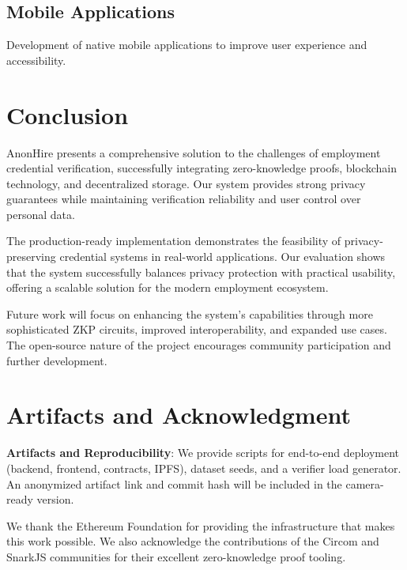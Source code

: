\documentclass[conference]{IEEEtran}
\begin{document}
\subsection{Mobile Applications}

Development of native mobile applications to improve user experience and accessibility.

\section{Conclusion}

AnonHire presents a comprehensive solution to the challenges of employment credential verification, successfully integrating zero-knowledge proofs, blockchain technology, and decentralized storage. Our system provides strong privacy guarantees while maintaining verification reliability and user control over personal data.

The production-ready implementation demonstrates the feasibility of privacy-preserving credential systems in real-world applications. Our evaluation shows that the system successfully balances privacy protection with practical usability, offering a scalable solution for the modern employment ecosystem.

Future work will focus on enhancing the system's capabilities through more sophisticated ZKP circuits, improved interoperability, and expanded use cases. The open-source nature of the project encourages community participation and further development.

\section*{Artifacts and Acknowledgment}

\textbf{Artifacts and Reproducibility}: We provide scripts for end-to-end deployment (backend, frontend, contracts, IPFS), dataset seeds, and a verifier load generator. An anonymized artifact link and commit hash will be included in the camera-ready version.

We thank the Ethereum Foundation for providing the infrastructure that makes this work possible. We also acknowledge the contributions of the Circom and SnarkJS communities for their excellent zero-knowledge proof tooling.
\end{document}
